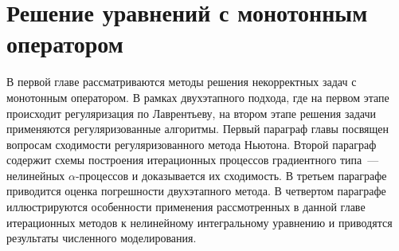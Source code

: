 \chapter{Решение уравнений с монотонным оператором}
В первой главе рассматриваются методы решения некорректных задач с монотонным оператором. В рамках двухэтапного подхода, где на первом этапе происходит регуляризация по Лаврентьеву, на втором этапе решения задачи применяются регуляризованные алгоритмы. Первый параграф главы посвящен вопросам сходимости регуляризованного метода Ньютона. Второй параграф содержит схемы построения итерационных процессов градиентного типа~--- нелинейных $\alpha$-процессов и доказывается их сходимость. В третьем параграфе приводится оценка погрешности двухэтапного метода. В четвертом параграфе иллюстрируются особенности применения рассмотренных в данной главе итерационных методов к нелинейному интегральному уравнению и приводятся результаты численного моделирования.

\newpage
